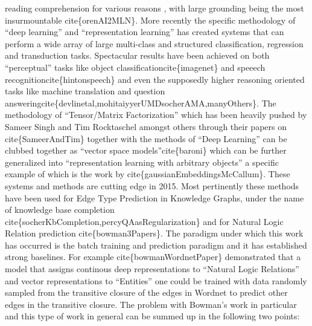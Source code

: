 \documentclass[12pt]{exam} %
\renewcommand{\cite}[1]{cite\{#1\}}
\begin{document}
\begin{questions}
{    reading comprehension for various reasons , with large grounding
    being the most insurmountable \cite{orenAI2MLN}. More recently the
    specific methodology of ``deep learning'' and ``representation
    learning'' has created systems that can perform a wide array of
    large multi-class and structured classification, regression and
    transduction tasks. Spectacular results have been achieved on both
    ``perceptual'' tasks like object classification\cite{imagenet} and
    speeech recognition\cite{hintonspeech} and even the supposedly
    higher reasoning oriented tasks like machine translation and
    question
    answering\cite{devlinetal,mohitaiyyerUMDsocherAMA,manyOthers}. The
    methodology of ``Tensor/Matrix Factorization'' which has been
    heavily pushed by Sameer Singh and Tim Rocktaschel amongst others
    through their papers on \cite{SameerAndTim} together with the
    methods of ``Deep Learning'' can be clubbed together as ``vector
    space models''\cite{baroni} which can be further generalized into
    ``representation learning with arbitrary objects'' a specific
    example of which is the work by \cite{gaussianEmbeddingsMcCallum}.
    These systems and methods are cutting edge in 2015. Most
    pertinently these methods have been used for Edge Type Prediction
    in Knowledge Graphs, under the name of knowledge base completion
    \cite{socherKbCompletion,percyQAasRegularization} and for Natural
    Logic Relation prediction \cite{bowman3Papers}. The paradigm under
    which this work has occurred is the batch training and prediction
    paradigm and it has established strong baselines. For example
    \cite{bowmanWordnetPaper} demonstrated that a model that assigns
    continous deep representations to ``Natural Logic Relations'' and
    vector representations to ``Entities'' one could be trained with
    data randomly sampled from the transitive closure of the edges in
    Wordnet to predict other edges in the transitive closure. The
    problem with Bowman's work in particular and this type of work in
    general can be summed up in the following two points:

}
\end{questions}
\end{document}
